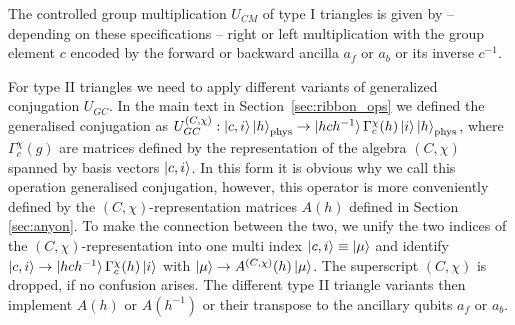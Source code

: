 \documentclass[two column]{article}
\begin{document}
The controlled group multiplication $U_{CM}$ of type I triangles is given by --  depending on these specifications -- right or left multiplication with the group element $c$ encoded by the forward or backward ancilla $a_f$ or $a_b$ or its inverse $c^{-1}$. 

For type II triangles we need to apply different variants of generalized conjugation $U_{GC}$. In the main text in Section~\ref{sec:ribbon_ops} we defined the generalised conjugation as $U_{GC}^{(C, \chi)}: \ket{c,i} \ket{h}_\text{phys}\rightarrow \ket{h c h^{-1}}\Gamma^\chi_c(h)\ket{i} \ket{h}_\text{phys}$, where $\Gamma^\chi_c(g)$ are matrices defined by the representation of the algebra $(C, \chi)$ spanned by basis vectors $\ket{c,i}$. In this form it is obvious why we call this operation generalised conjugation, however, this operator is more conveniently defined by the $(C, \chi)$-representation matrices $A(h)$ defined in Section \ref{sec:anyon}. To make the connection between the two, we unify the two indices of the $(C, \chi)$-representation into one multi index $\ket{c, i} \equiv \ket{\mu}$ and identify $\ket{c,i} \to \ket{hch^{-1}} \Gamma_c^\chi(h) \ket{i}$ with $\ket{\mu} \to A^{(C,\chi)}(h) \ket{\mu}$. The superscript $(C,\chi)$ is dropped, if no confusion arises. The different type II triangle variants then implement $A(h)$ or $A(h^{-1})$ or their transpose to the ancillary qubits $a_f$ or $a_b$.
\end{document}
